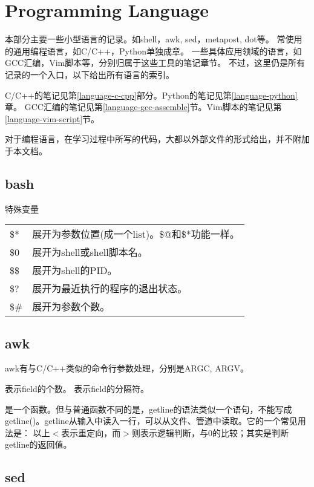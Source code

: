 \part{Programming Language}

本部分主要一些小型语言的记录。如shell，awk, sed，metapost, dot等。
常使用的通用编程语言，如C/C++，Python单独成章。
一些具体应用领域的语言，如GCC汇编，Vim脚本等，分别归属于这些工具的笔记章节。
不过，这里仍是所有记录的一个入口，以下给出所有语言的索引。

C/C++的笔记见第\ref{language-c-cpp}部分。Python的笔记见第\ref{language-python}章。
GCC汇编的笔记见第\ref{language-gcc-assemble}节。Vim脚本的笔记见第\ref{language-vim-script}节。

对于编程语言，在学习过程中所写的代码，大都以外部文件的形式给出，并不附加于本文档。

\chapter{bash}

特殊变量\\
\begin{tabular}{ll}
\$*     &   展开为参数位置(成一个list)。\$@和\$*功能一样。\\
\$0     &   展开为shell或shell脚本名。\\
\$\$    &   展开为shell的PID。\\
\$?     &   展开为最近执行的程序的退出状态。\\
\$\#    &   展开为参数个数。\\
\end{tabular}

\chapter{awk}
awk有与C/C++类似的命令行参数处理，分别是ARGC, ARGV。

表示field的个数。
表示field的分隔符。

是一个函数。但与普通函数不同的是，getline的语法类似一个语句，不能写成
getline()。getline从输入中读入一行，可以从文件、管道中读取。它的一个常见用法是：
以上$<$表示重定向，而$>$则表示逻辑判断，与0的比较；其实是判断getline的返回值。

\chapter{sed}
